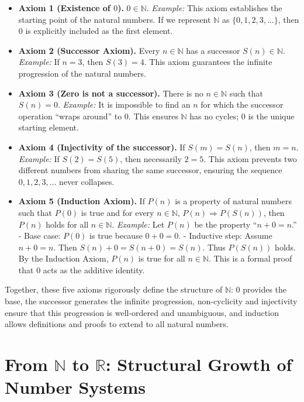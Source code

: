 \documentclass[10pt]{article}
\begin{document}
\begin{itemize}
	\item \textbf{Axiom 1 (Existence of $0$).}  
	$0 \in \mathbb{N}$.  
	\textit{Example:} This axiom establishes the starting point of the natural numbers. If we represent $\mathbb{N}$ as $\{0,1,2,3,\dots\}$, then $0$ is explicitly included as the first element.
	
	\item \textbf{Axiom 2 (Successor Axiom).}  
	Every $n \in \mathbb{N}$ has a successor $S(n) \in \mathbb{N}$.  
	\textit{Example:} If $n=3$, then $S(3)=4$. This axiom guarantees the infinite progression of the natural numbers.
	
	\item \textbf{Axiom 3 (Zero is not a successor).}  
	There is no $n \in \mathbb{N}$ such that $S(n)=0$.  
	\textit{Example:} It is impossible to find an $n$ for which the successor operation “wraps around” to $0$. This ensures $\mathbb{N}$ has no cycles; $0$ is the unique starting element.
	
	\item \textbf{Axiom 4 (Injectivity of the successor).}  
	If $S(m)=S(n)$, then $m=n$.  
	\textit{Example:} If $S(2)=S(5)$, then necessarily $2=5$. This axiom prevents two different numbers from sharing the same successor, ensuring the sequence $0,1,2,3,\dots$ never collapses.
	
	\item \textbf{Axiom 5 (Induction Axiom).}  
	If $P(n)$ is a property of natural numbers such that $P(0)$ is true and for every $n \in \mathbb{N}$, $P(n) \Rightarrow P(S(n))$, then $P(n)$ holds for all $n \in \mathbb{N}$.  
	\textit{Example:} Let $P(n)$ be the property “$n+0=n$.”  
	- Base case: $P(0)$ is true because $0+0=0$.  
	- Inductive step: Assume $n+0=n$. Then $S(n)+0=S(n+0)=S(n)$. Thus $P(S(n))$ holds.  
	By the Induction Axiom, $P(n)$ is true for all $n \in \mathbb{N}$. This is a formal proof that $0$ acts as the additive identity.
\end{itemize}

Together, these five axioms rigorously define the structure of $\mathbb{N}$: $0$ provides the base, the successor generates the infinite progression, non-cyclicity and injectivity ensure that this progression is well-ordered and unambiguous, and induction allows definitions and proofs to extend to all natural numbers.

\section*{From $\mathbb{N}$ to $\mathbb{R}$: Structural Growth of Number Systems}
\end{document}
